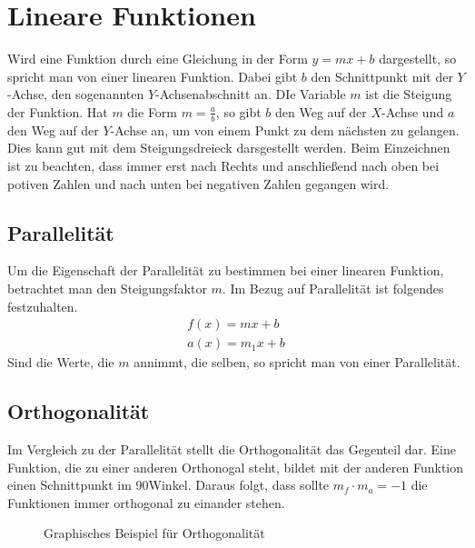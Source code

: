 \section{Lineare Funktionen}\label{sec:Lineare Funktionen}
Wird eine Funktion durch eine Gleichung in der Form $y=mx+b$ dargestellt, so spricht man von einer linearen Funktion. Dabei gibt $b$ den Schnittpunkt mit der $Y$-Achse, den sogenannten $Y$-Achsenabschnitt an. DIe Variable $m$ ist die Steigung der Funktion. Hat $m$ die Form $m=\frac{a}{b}$, so gibt $b$ den Weg auf der $X$-Achse und $a$ den Weg auf der $Y$-Achse an, um von einem Punkt zu dem nächsten zu gelangen. Dies kann gut mit dem Steigungsdreieck darsgestellt werden. Beim Einzeichnen ist zu beachten, dass immer erst nach Rechts und anschließend nach oben bei potiven Zahlen und nach unten bei negativen Zahlen gegangen wird.
\subsection{Parallelität}\label{sec:Lineare Funktionen/Parallelitaet}
 Um die Eigenschaft der Parallelität zu bestimmen bei einer linearen Funktion, betrachtet man den Steigungsfaktor $m$.
Im Bezug auf Parallelität ist folgendes festzuhalten. 
\begin{align*}
	f(x)=mx+b\\
	a(x)=m_1x+b
\end{align*}
Sind die Werte, die $m$ annimmt, die selben, so spricht man von einer Parallelität.
\subsection{Orthogonalität}\label{sec:Lineare Funktionen/Orthogonalitaet}
 Im Vergleich zu der Parallelität stellt die Orthogonalität das Gegenteil dar. Eine Funktion, die zu einer anderen Orthonogal steht, bildet mit der anderen Funktion einen Schnittpunkt im 90\degree Winkel. Daraus folgt, dass sollte $m_f\cdot m_a=-1$ die Funktionen immer orthogonal zu einander stehen.
\begin{figure}[h!]
\centering
{}
\caption{Graphisches Beispiel für Orthogonalität}
\end{figure}
